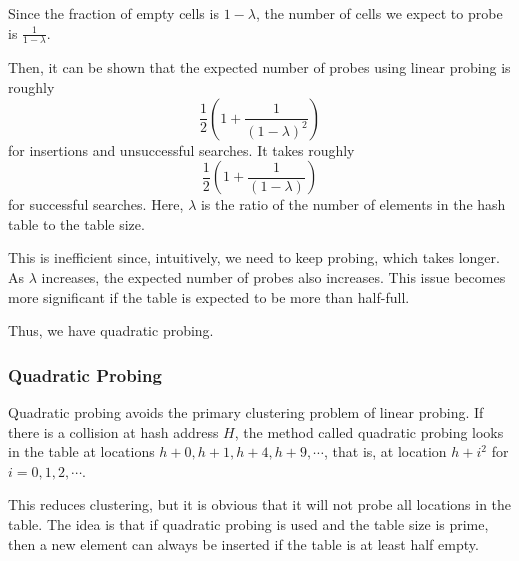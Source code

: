 Since the fraction of empty cells is \(1 - \lambda\), the number of cells we expect to probe is \(\frac{1}{1 - \lambda}\).

Then, it can be shown that the expected number of probes using linear probing is roughly 
\[
\frac{1}{2} \left( 1 + \frac{1}{(1 - \lambda)^2} \right)
\]
for insertions and unsuccessful searches. It takes roughly 
\[
\frac{1}{2} \left( 1 + \frac{1}{(1 - \lambda)} \right)
\]
for successful searches. Here, \(\lambda\) is the ratio of the number of elements in the hash table to the table size.

This is inefficient since, intuitively, we need to keep probing, which takes longer. As \(\lambda\) increases, the expected number of probes also increases. This issue becomes more significant if the table is expected to be more than half-full. 

Thus, we have quadratic probing.

\subsubsection{Quadratic Probing}
Quadratic probing avoids the primary clustering problem of linear probing. If there is a collision at hash address \(H\), the method called quadratic probing looks in the table at locations \(h + 0, h + 1, h + 4, h + 9, \cdots\), that is, at location \(h + i^2\) for \(i = 0, 1, 2, \cdots\).

This reduces clustering, but it is obvious that it will not probe all locations in the table. The idea is that if quadratic probing is used and the table size is prime, then a new element can always be inserted if the table is at least half empty.


